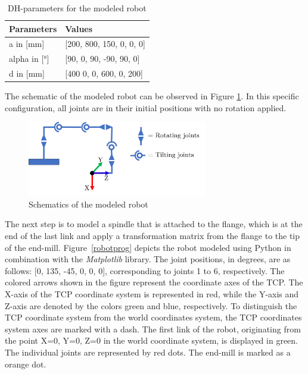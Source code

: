 
\begin{table}[H]
	\centering
	\begin{tabular}{||l|l||}
		Parameters  & Values \\
		\hline
		\hline
		\hline
		a in [mm] 	&		[200, 800, 150, 0,   0, 0] \\
		alpha in [°]	&  	[90,  0,   90,  -90, 90,  0] \\
		d in [mm]	& 		[400  0,   0,   600, 0,   200]\\
		
		\hline
		\hline
	\end{tabular}
	
	\caption{DH-parameters for the modeled robot}
	\label{DHp}
\end{table}

The schematic of the modeled robot can be observed in Figure \ref{schema}. In this specific configuration, all joints are in their initial positions with no rotation applied.\newline

\begin{figure}[H]
	\centerline{\includegraphics[width=0.7\textwidth]{figures/schema.png}}
	\caption{Schematics of the modeled robot}
	\label{schema}
\end{figure}

The next step is to model a spindle that is attached to the flange, which is at the end of the last link and apply a transformation matrix from the flange to the tip of the end-mill.
Figure~\ref{robotprog} depicts the robot modeled using Python in combination with the \textit{Matplotlib} library. The joint positions, in degrees, are as follows: [0, 135, -45, 0, 0, 0], corresponding to joints 1 to 6, respectively. The colored arrows shown in the figure represent the coordinate axes of the \acrshort{TCP}. The X-axis of the \acrshort{TCP} coordinate system is represented in red, while the Y-axis and Z-axis are denoted by the colors green and blue, respectively. To distinguish the \acrshort{TCP} coordinate system from the world coordinates system, the \acrshort{TCP} coordinates system axes are marked with a dash. The first link of the robot, originating from the point X=0, Y=0, Z=0 in the world coordinate system, is displayed in green. The individual joints are represented by red dots. The end-mill is marked as a orange dot.


